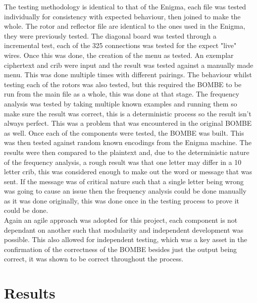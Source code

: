 \documentclass[12pt,a4paper]{article}
\begin{document}
The testing methodology is identical to that of the Enigma, each file was tested individually for consistency with expected behaviour, then joined to make the whole. The rotor and reflector file are identical to the ones used in the Enigma, they were previously tested. The diagonal board was tested through a incremental test, each of the 325 connections was tested for the expect "live" wires. Once this was done, the creation of the menu as tested. An exemplar ciphertext and crib were input and the result was tested against a manually made menu. This was done multiple times with different pairings. The behaviour whilst testing each of the rotors was also tested, but this required the BOMBE to be run from the main file as a whole, this was done at that stage. The frequency analysis was tested by taking multiple known examples and running them so make sure the result was correct, this is a deterministic process so the result isn't always perfect. This was a problem that was encountered in the original BOMBE as well. Once each of the components were tested, the BOMBE was built. This was then tested against random known encodings from the Enigma machine. The results were then compared to the plaintext and, due to the deterministic nature of the frequency analysis, a rough result was that one letter may differ in a 10 letter crib, this was considered enough to make out the word or message that was sent. If the message was of critical nature such that a single letter being wrong was going to cause an issue then the frequency analysis could be done manually as it was done originally, this was done once in the testing process to prove it could be done.\\

Again an agile approach was adopted for this project, each component is not dependant on another such that modularity and independent development was possible. This also allowed for independent testing, which was a key asset in the confirmation of the correctness of the BOMBE besides just the output being correct, it was shown to be correct throughout the process.

\section{Results}

\end{document}
